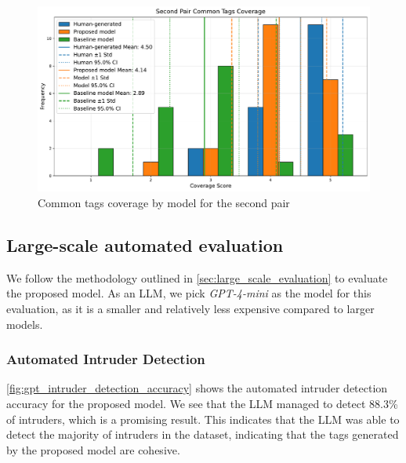 \begin{figure}[h]
    \centering
    \includegraphics[width=1\textwidth]{figures/second_pair_common_tags_coverage_comparison.pdf}
    \caption{Common tags coverage by model for the second pair}
    \label{fig:second_pair_common_tags_coverage_comparison}
\end{figure}



\subsection{Large-scale automated evaluation}
We follow the methodology outlined in \cref{sec:large_scale_evaluation} to evaluate the proposed model. As an LLM, we pick \textit{GPT-4-mini} as the model for this evaluation, as it is a smaller and relatively less expensive compared to larger models.

\subsubsection{Automated Intruder Detection}
\cref{fig:gpt_intruder_detection_accuracy} shows the automated intruder detection accuracy for the proposed model. We see that the LLM managed to detect 88.3\% of intruders, which is a promising result. This indicates that the LLM was able to detect the majority of intruders in the dataset, indicating that the tags generated by the proposed model are cohesive.

